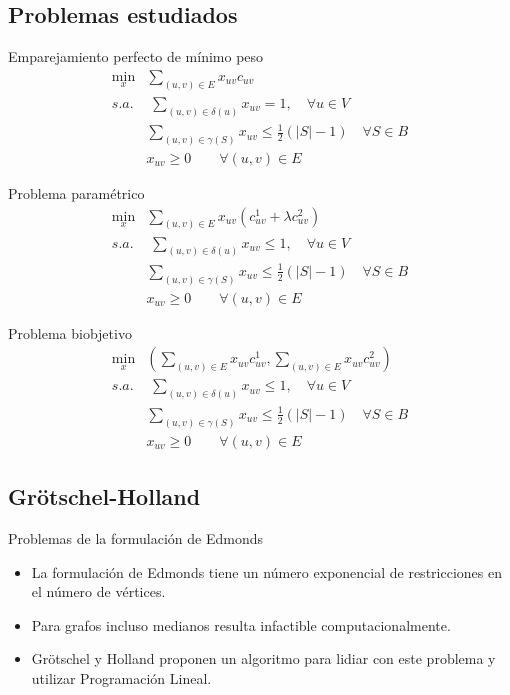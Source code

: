 \documentclass{beamer}
\begin{document}
\subsection{Problemas estudiados}
\begin{frame}{Emparejamiento perfecto de mínimo peso}
\begin{align*}
\min_x & \sum_{(u,v) \in E}x_{uv}c_{uv}\\
s.a.&\;\sum_{(u,v)\in\delta(u)} x_{uv} = 1, \quad \forall u \in V\\
&\sum_{(u,v)\in \gamma(S)} x_{uv} \leq \frac{1}{2}(|S|-1)\quad \forall S \in B	\\
&x_{uv} \geq 0 \qquad \forall(u,v)\in E
\end{align*}
\end{frame}
\begin{frame}{Problema paramétrico}\begin{align*}
\min_x & \sum_{(u,v) \in E}x_{uv} (c^1_{uv} + \lambda c^2_{uv})\\
s.a.&\;\sum_{(u,v)\in\delta(u)} x_{uv} \leq 1, \quad \forall u \in V\\
&\sum_{(u,v)\in \gamma(S)} x_{uv} \leq \frac{1}{2}(|S|-1)\quad \forall S \in B	\\
&x_{uv} \geq 0 \qquad \forall(u,v)\in E
\end{align*}
\end{frame}
\begin{frame}{Problema biobjetivo}
\begin{align*}
\min_x & \left(\sum_{(u,v) \in E}x_{uv}c^1_{uv},\sum_{(u,v) \in E}x_{uv} c^2_{uv}\right)\\
s.a.&\;\sum_{(u,v)\in\delta(u)} x_{uv} \leq 1, \quad \forall u \in V\\
&\sum_{(u,v)\in \gamma(S)} x_{uv} \leq \frac{1}{2}(|S|-1)\quad \forall S \in B	\\
&x_{uv} \geq 0 \qquad \forall(u,v)\in E
\end{align*}
\end{frame}
\subsection{Grötschel-Holland}
\begin{frame}{Problemas de la formulación de Edmonds}
\begin{itemize}
\item La formulación de Edmonds tiene un número exponencial de restricciones en el número de vértices.
\item Para grafos incluso medianos resulta infactible computacionalmente.
\item Grötschel y Holland proponen un algoritmo para lidiar con este problema y utilizar Programación Lineal.
\end{itemize}
\end{frame}
\end{document}
